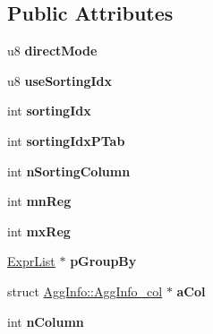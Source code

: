 \subsection*{Public Attributes}
\begin{DoxyCompactItemize}
\item 
\hypertarget{struct_agg_info_aaa57d294016ac7e17e7cacaa7b25634e}{u8 {\bfseries direct\+Mode}}\label{struct_agg_info_aaa57d294016ac7e17e7cacaa7b25634e}

\item 
\hypertarget{struct_agg_info_a8173a7ea13c4a12ce4befbcb40719073}{u8 {\bfseries use\+Sorting\+Idx}}\label{struct_agg_info_a8173a7ea13c4a12ce4befbcb40719073}

\item 
\hypertarget{struct_agg_info_a97ce74f509ca908a616c123e7196797b}{int {\bfseries sorting\+Idx}}\label{struct_agg_info_a97ce74f509ca908a616c123e7196797b}

\item 
\hypertarget{struct_agg_info_a7faac4c3996598960fc46f0c173b244c}{int {\bfseries sorting\+Idx\+P\+Tab}}\label{struct_agg_info_a7faac4c3996598960fc46f0c173b244c}

\item 
\hypertarget{struct_agg_info_a89925dccd1a0ec51d2a5a5dbaead66dc}{int {\bfseries n\+Sorting\+Column}}\label{struct_agg_info_a89925dccd1a0ec51d2a5a5dbaead66dc}

\item 
\hypertarget{struct_agg_info_aa9a656c3db8fe0f2905062bbcc55efdc}{int {\bfseries mn\+Reg}}\label{struct_agg_info_aa9a656c3db8fe0f2905062bbcc55efdc}

\item 
\hypertarget{struct_agg_info_a7aec99396ee3da0bdd985685de1b9da2}{int {\bfseries mx\+Reg}}\label{struct_agg_info_a7aec99396ee3da0bdd985685de1b9da2}

\item 
\hypertarget{struct_agg_info_aa8e942103d224c4db847743670907781}{\hyperlink{struct_expr_list}{Expr\+List} $\ast$ {\bfseries p\+Group\+By}}\label{struct_agg_info_aa8e942103d224c4db847743670907781}

\item 
\hypertarget{struct_agg_info_a52fa1a7eb3145c27be13b2bcccd57d62}{struct \hyperlink{struct_agg_info_1_1_agg_info__col}{Agg\+Info\+::\+Agg\+Info\+\_\+col} $\ast$ {\bfseries a\+Col}}\label{struct_agg_info_a52fa1a7eb3145c27be13b2bcccd57d62}

\item 
\hypertarget{struct_agg_info_a9cbfa5fc33328cf3500426674e036a8b}{int {\bfseries n\+Column}}\label{struct_agg_info_a9cbfa5fc33328cf3500426674e036a8b}


\end{DoxyCompactItemize}
